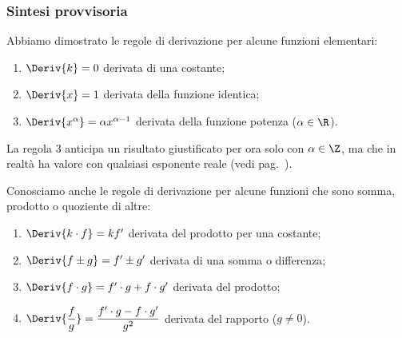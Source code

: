 \subsubsection{Sintesi provvisoria}
\label{subsubsec:diff01_sintesiprovvisoria}
Abbiamo dimostrato le regole di derivazione per alcune funzioni elementari: 
\begin{enumerate} [noitemsep]
 \item \(\Deriv{k} = 0\) \tab  derivata di una 
costante;
 \item \(\Deriv{x} = 1\) \tab derivata della funzione identica;
 \item \(\Deriv{x^\alpha} = \alpha x^{\alpha-1}\) 
\tab  derivata della funzione potenza (\(\alpha \in \R\)).
\end{enumerate}
\begin{osservazione}
\label{oss:regola3}
La regola 3 anticipa un risultato giustificato per ora solo con 
\(\alpha \in \Z\), 
ma che in realtà ha valore con qualsiasi esponente reale 
(vedi pag.~\pageref{teo:funzione_potenza_generica}).
\end{osservazione}

Conosciamo anche le regole di derivazione per alcune funzioni che sono 
somma, prodotto o quoziente di altre:
\begin{enumerate} [noitemsep]
 \item \(\Deriv{k\cdot f}=kf'\) \tab 
 derivata del prodotto per una costante;
 \item \(\Deriv{f\pm g}=f'\pm g'\) \tab 
 derivata di una somma o differenza;
 \item \(\Deriv{f\cdot g}= f'\cdot g+f\cdot g'\) \tab 
 derivata del prodotto;
 \item \(\Deriv{\dfrac{f}{g}}=\dfrac{f'\cdot 
g-f\cdot g'}{g^2}\)\tab 
derivata  del rapporto (\(g \ne 0\)).
\end{enumerate}

